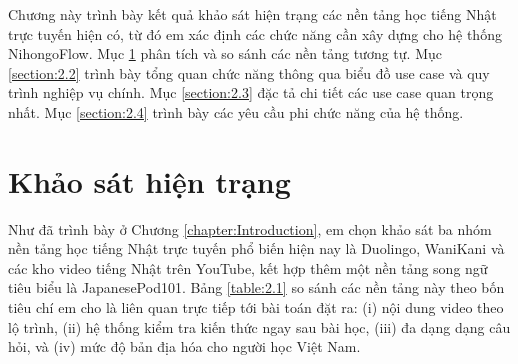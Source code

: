 \documentclass[../DoAn.tex]{subfiles}
\begin{document}
Chương này trình bày kết quả khảo sát hiện trạng các nền tảng học tiếng Nhật trực tuyến hiện có, từ đó em xác định các chức năng cần xây dựng cho hệ thống NihongoFlow. Mục \ref{section:2.1} phân tích và so sánh các nền tảng tương tự. Mục \ref{section:2.2} trình bày tổng quan chức năng thông qua biểu đồ use case và quy trình nghiệp vụ chính. Mục \ref{section:2.3} đặc tả chi tiết các use case quan trọng nhất. Mục \ref{section:2.4} trình bày các yêu cầu phi chức năng của hệ thống.

\section{Khảo sát hiện trạng}
\label{section:2.1}

Như đã trình bày ở Chương \ref{chapter:Introduction}, em chọn khảo sát ba nhóm nền tảng học tiếng Nhật trực tuyến phổ biến hiện nay là Duolingo, WaniKani và các kho video tiếng Nhật trên YouTube, kết hợp thêm một nền tảng song ngữ tiêu biểu là JapanesePod101. Bảng \ref{table:2.1} so sánh các nền tảng này theo bốn tiêu chí em cho là liên quan trực tiếp tới bài toán đặt ra: (i) nội dung video theo lộ trình, (ii) hệ thống kiểm tra kiến thức ngay sau bài học, (iii) đa dạng dạng câu hỏi, và (iv) mức độ bản địa hóa cho người học Việt Nam.

\begin{table}[H]
\centering
\renewcommand{\arraystretch}{1.3}
\renewcommand{\arraystretch}{1}
\caption{So sánh NihongoFlow với các nền tảng học tiếng Nhật hiện có}
\label{table:2.1}
\end{table}
\end{document}
